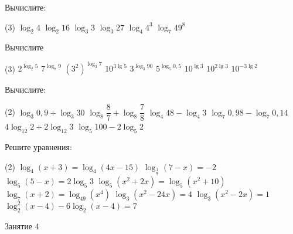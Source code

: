 \begin{homework}[number=1]
	\begin{listofex}
		\item Вычислите:
		\begin{tasks}(3)
			\task \( \log_2 4 \)
			\task \( \log_2 16 \)
			\task \( \log_3 3 \)
			\task \( \log_3 27 \)
			\task \( \log_4 4^3 \)
			\task \( \log_7 49^8 \)
		\end{tasks}
		\item Вычислите
		\begin{tasks}(3)
			\task \( 2^{\log_2 5} \)
			\task \( 7^{\log_7 9} \)
			\task \( (3^2)^{\log_3 7} \)
			\task \( 10^{3\lg 5} \)
			\task \( 3^{\log_3 90} \)
			\task \( 5^{\log_5 0,5} \)
			\task \( 10^{\lg 3} \)
			\task \( 10^{2\lg 3} \)
			\task \( 10^{-3\lg 2} \)
			\end{tasks}
		\item Вычислите:
		\begin{tasks}(2)
			\task \( \log_3 0,9 + \log_3 30 \)
			\task \( \log_8 \dfrac{8}{7} + \log_8 \dfrac{7}{8} \)
			\task \( \log_4 48 - \log_4 3 \)
			\task \( \log_7 0,98 - \log_7 0,14 \)
			\task \( 4\log_{12} 2 + 2\log_{12} 3 \)
			\task \( \log_5 100 - 2 \log_5 2 \)
		\end{tasks}
		\item Решите уравнения: %
		\begin{tasks}(2)
			\task \( \log_4 (x+3) = \log_4 (4x-15) \)
			\task \( \log_{\tfrac{1}{7}}(7-x) = -2 \)
			\task \( \log_5 (5-x) = 2 \log_5 3 \)
			\task \( \log_5 (x^2+2x) = \log_5 (x^2+10) \)
			\task \( \log_7 (x+2) = \log_{49} (x^4) \)
			\task \( \log_3 (x^2-24x)=4 \)
			\task \( \log_3 (x^2-2x)=1 \)
			\task \( \log_2^2 (x-4) -6 \log_2 (x-4) = 7 \)
		\end{tasks}
	\end{listofex}
\end{homework}

\begin{class}[number=3]
	\begin{listofex}
		\item 
	\end{listofex}
\end{class}

\begin{class}[number=4]
	\begin{listofex}
		\item Занятие 4
	\end{listofex}
\end{class}

